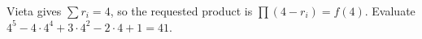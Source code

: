 Vieta gives $\sum r_i=4$, so the requested product is $\prod(4-r_i)=f(4)$. Evaluate $4^5-4\cdot4^4+3\cdot4^2-2\cdot4+1=\boxed{41}$.
